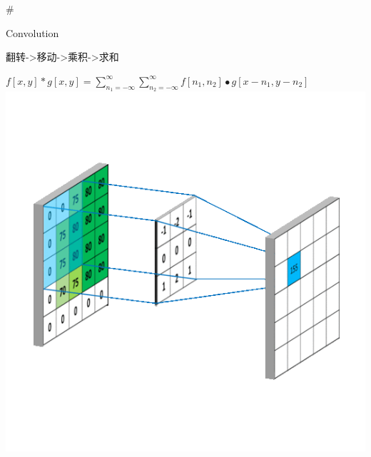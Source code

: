 \documentclass[11pt]{article}
\makeatletter
\def\maxwidth{\ifdim\Gin@nat@width>\linewidth\linewidth
    \else\Gin@nat@width\fi}
\let\Oldincludegraphics\includegraphics
\renewcommand{\includegraphics}[1]{\Oldincludegraphics[width=.8\maxwidth]{#1}}
\makeatother
\begin{document}
    \#

Convolution

翻转-\textgreater{}移动-\textgreater{}乘积-\textgreater{}求和

\(f[x,y]*g[x,y] = \sum\limits_{{n_1} = - \infty }^\infty {\sum\limits_{{n_2} = - \infty }^\infty {f[{n_1},{n_2}]\bullet g[x - {n_1},y - {n_2}]} }\)
\includegraphics{conv.gif}
\end{document}
